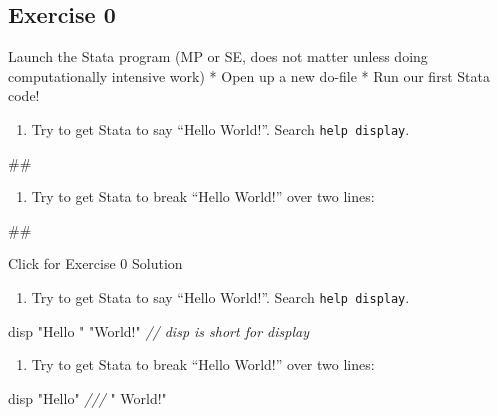 \documentclass[
]{book}
\newenvironment{Shaded}{\begin{snugshade}}{\end{snugshade}}
\newcommand{\CommentTok}[1]{\textcolor[rgb]{0.56,0.35,0.01}{\textit{#1}}}
\newcommand{\NormalTok}[1]{#1}
\newcommand{\StringTok}[1]{\textcolor[rgb]{0.31,0.60,0.02}{#1}}
\providecommand{\tightlist}{%
  \setlength{\itemsep}{0pt}\setlength{\parskip}{0pt}}
\begin{document}
\hypertarget{exercise-0-5}{%
\subsection{Exercise 0}\label{exercise-0-5}}

Launch the Stata program (MP or SE, does not matter unless doing computationally intensive work)
* Open up a new do-file
* Run our first Stata code!

\begin{enumerate}
\def\labelenumi{\arabic{enumi}.}
\tightlist
\item
  Try to get Stata to say ``Hello World!''. Search \texttt{help\ display}.
\end{enumerate}

\begin{Shaded}
\begin{Highlighting}[]
\NormalTok{\#\#}
\end{Highlighting}
\end{Shaded}

\begin{enumerate}
\def\labelenumi{\arabic{enumi}.}
\setcounter{enumi}{1}
\tightlist
\item
  Try to get Stata to break ``Hello World!'' over two lines:
\end{enumerate}

\begin{Shaded}
\begin{Highlighting}[]
\NormalTok{\#\#}
\end{Highlighting}
\end{Shaded}

{Click for Exercise 0 Solution}

\begin{alert}

\begin{enumerate}
\def\labelenumi{\arabic{enumi}.}
\tightlist
\item
  Try to get Stata to say ``Hello World!''. Search \texttt{help\ display}.
\end{enumerate}

\begin{Shaded}
\begin{Highlighting}[]
\NormalTok{disp }\StringTok{"Hello "} \StringTok{"World!"} \CommentTok{// \textquotesingle{}disp\textquotesingle{} is short for \textquotesingle{}display\textquotesingle{}}
\end{Highlighting}
\end{Shaded}

\begin{enumerate}
\def\labelenumi{\arabic{enumi}.}
\setcounter{enumi}{1}
\tightlist
\item
  Try to get Stata to break ``Hello World!'' over two lines:
\end{enumerate}

\begin{Shaded}
\begin{Highlighting}[]
\NormalTok{disp }\StringTok{"Hello"} \CommentTok{///}
     \StringTok{" World!"}
\end{Highlighting}
\end{Shaded}

\end{alert}
\end{document}
